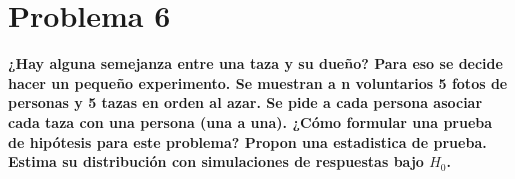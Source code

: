 \section*{Problema 6}

\textbf{¿Hay alguna semejanza entre una taza y su dueño? Para eso se decide hacer un pequeño experimento. Se muestran a n voluntarios 5 fotos de personas y 5 tazas en orden al azar. Se pide a cada persona asociar cada taza con una persona (una a una). ¿Cómo formular una prueba de hipótesis para este problema? Propon una estadistica de prueba. Estima su distribución con simulaciones de respuestas bajo $H_0$.}
